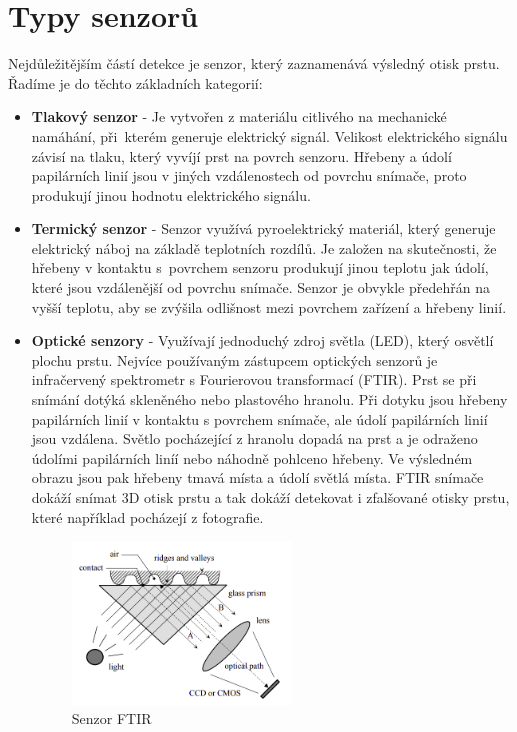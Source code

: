 \section{Typy senzorů}
Nejdůležitějším částí detekce je senzor, který zaznamenává výsledný otisk prstu. Řadíme je do těchto základních kategorií:
\begin{itemize}
\item \textbf{Tlakový senzor} - Je vytvořen z materiálu citlivého na mechanické namáhání, při~kterém generuje elektrický signál. Velikost elektrického signálu závisí na tlaku, který vyvíjí prst na povrch senzoru. Hřebeny a údolí papilárních linií jsou v jiných vzdálenostech od povrchu snímače, proto produkují jinou hodnotu elektrického signálu. \cite{Maltoni2009}
\item \textbf{Termický senzor} - Senzor využívá pyroelektrický materiál, který generuje elektrický náboj na základě teplotních rozdílů. Je založen na skutečnosti, že hřebeny v kontaktu s~povrchem senzoru produkují jinou teplotu jak údolí, které jsou vzdálenější od povrchu snímače. Senzor je obvykle předehřán na vyšší teplotu, aby se zvýšila odlišnost mezi povrchem zařízení a hřebeny linií. \cite{Maltoni2009}
\item \textbf{Optické senzory} - Využívají jednoduchý zdroj světla (LED), který osvětlí plochu prstu. \cite{Drahansky} Nejvíce používaným zástupcem optických senzorů je infračervený spektrometr s Fourierovou transformací (FTIR). Prst se při snímání dotýká skleněného nebo plastového hranolu. Při dotyku jsou hřebeny papilárních linií v kontaktu s povrchem snímače, ale údolí papilárních linií jsou vzdálena. Světlo pocházející z hranolu dopadá na prst a je odraženo údolími papilárních liníí nebo náhodně pohlceno hřebeny. Ve výsledném obrazu jsou pak hřebeny tmavá místa a údolí světlá místa. FTIR snímače dokáží snímat 3D otisk prstu a tak dokáží detekovat i zfalšované otisky prstu, které například pocházejí z fotografie. \cite{Maltoni2009}

\begin{figure}[!htbp]
    \centering
    \includegraphics[width=220px]{obrazky-figures/ftiredit.png}
    \caption{Senzor FTIR \cite{Maltoni2009}}
\end{figure}


\end{itemize}
